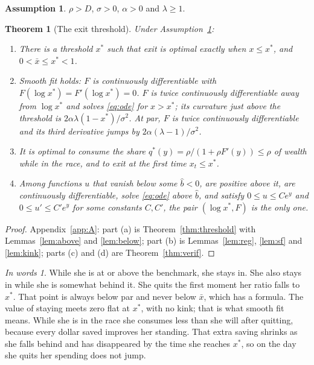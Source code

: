 \documentclass[12pt]{article}
\newtheorem{theorem}{Theorem}
\theoremstyle{definition}
\newtheorem{assumption}{Assumption}
\theoremstyle{remark}
\newtheorem*{inwords}{In words}
\newcommand{\OAref}[1]{\ref{#1}}
\theoremstyle{plain}
\theoremstyle{definition}
\begin{document}
\begin{assumption}\label{ass:main}
$\rho>D$, $\sigma>0$, $\alpha>0$ and $\lambda\ge1$.
\end{assumption}

\begin{theorem}[The exit threshold]\label{thm:main}
Under Assumption~\ref{ass:main}:
\begin{enumerate}[label=(\alph*)]
\item There is a threshold $x^*$ such that exit is optimal exactly when $x\le x^*$, and $0<\bar x\le x^*<1$.
\item Smooth fit holds: $F$ is continuously differentiable with $F(\log x^*)=F'(\log x^*)=0$. $F$ is twice continuously differentiable away from $\log x^*$ and solves \eqref{eq:ode} for $x>x^*$; its curvature just above the threshold is $2\alpha\lambda(1-x^*)/\sigma^2$. At par, $F$ is twice continuously differentiable and its third derivative jumps by $2\alpha(\lambda-1)/\sigma^2$.
\item It is optimal to consume the share $q^*(y)=\rho/(1+\rho F'(y))\le\rho$ of wealth while in the race, and to exit at the first time $x_t\le x^*$.
\item Among functions $u$ that vanish below some $\hat b<0$, are positive above it, are continuously differentiable, solve \eqref{eq:ode} above $\hat b$, and satisfy $0\le u\le Ce^y$ and $0\le u'\le C'e^y$ for some constants $C,C'$, the pair $(\log x^*,F)$ is the only one.
\end{enumerate}
\end{theorem}

\begin{proof}
Appendix~\ref{app:A}: part (a) is Theorem~\OAref{thm:threshold} with Lemmas~\OAref{lem:above} and \OAref{lem:below}; part (b) is Lemmas~\OAref{lem:reg}, \OAref{lem:sf} and \OAref{lem:kink}; parts (c) and (d) are Theorem~\OAref{thm:verif}.
\end{proof}

\begin{inwords}
While she is at or above the benchmark, she stays in. She also stays in while she is somewhat behind it. She quits the first moment her ratio falls to $x^*$. That point is always below par and never below $\bar x$, which has a formula. The value of staying meets zero flat at $x^*$, with no kink; that is what smooth fit means. While she is in the race she consumes less than she will after quitting, because every dollar saved improves her standing. That extra saving shrinks as she falls behind and has disappeared by the time she reaches $x^*$, so on the day she quits her spending does not jump.
\end{inwords}
\end{document}
